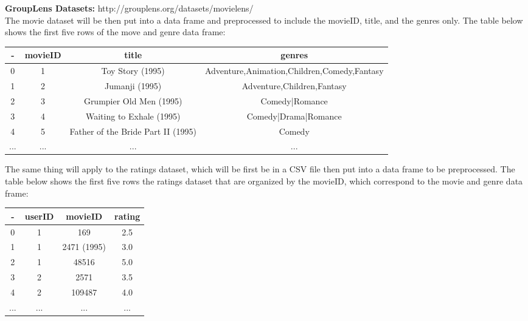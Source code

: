 \documentclass{article}
\begin{document}
\textbf{GroupLens Datasets:} http://grouplens.org/datasets/movielens/\\
 
The movie dataset will be then put into a data frame and preprocessed to include the movieID, title, and the genres only. The table below shows the 
first five rows of the move and genre data frame:
\begin{center}
\begin{adjustwidth}{-1.75cm}{}
\begin{tabular}{||c c c c||}
    \hline
    - & movieID & title & genres \\ [0.5ex] 
    \hline\hline
    0 & 1 & Toy Story (1995) & Adventure,Animation,Children,Comedy,Fantasy \\ 
    \hline
    1 & 2 & Jumanji (1995) & Adventure,Children,Fantasy \\
    \hline
    2 & 3 & Grumpier Old Men (1995) & Comedy|Romance \\
    \hline
    3 & 4 & Waiting to Exhale (1995) & Comedy|Drama|Romance \\
    \hline
    4 & 5 & Father of the Bride Part II (1995) & Comedy \\
    \hline
    ... & ... & ... & ... \\ [1ex]
    \hline
\end{tabular}
\end{adjustwidth}
\end{center}

The same thing will apply to the ratings dataset, which will be first be in a CSV file then put into a data frame to be preprocessed. The table below shows the first 
five rows the ratings dataset that are organized by the movieID, which correspond to the movie and genre data frame:
\begin{center}
\begin{tabular}{||c c c c||}
        \hline
    - & userID & movieID & rating \\ [0.5ex] 
    \hline\hline
    0 & 1 & 169 & 2.5 \\ 
    \hline
    1 & 1 & 2471 (1995) & 3.0 \\
    \hline
    2 & 1 & 48516 & 5.0 \\
    \hline
    3 & 2 & 2571 & 3.5 \\
    \hline
    4 & 2 & 109487 & 4.0 \\
    \hline
    ... & ... & ... & ... \\ [1ex] 
    \hline
\end{tabular}
\end{center}
\end{document}
